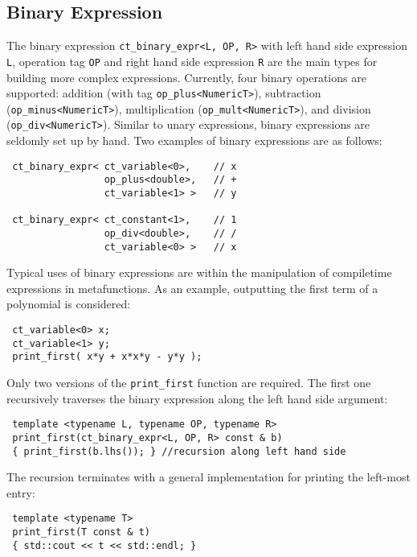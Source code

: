 \subsection{Binary Expression}
The binary expression \lstinline|ct_binary_expr<L, OP, R>| with left hand side expression \lstinline|L|, operation tag \lstinline|OP| and right hand side expression \lstinline|R| are the main types for building more complex expressions.
Currently, four binary operations are supported: addition (with tag \lstinline|op_plus<NumericT>|), subtraction (\lstinline|op_minus<NumericT>|), multiplication (\lstinline|op_mult<NumericT>|), and division (\lstinline|op_div<NumericT>|).
Similar to unary expressions, binary expressions are seldomly set up by hand.
Two examples of binary expressions are as follows:
\begin{lstlisting}
 ct_binary_expr< ct_variable<0>,    // x
                 op_plus<double>,   // +
                 ct_variable<1> >   // y  

 ct_binary_expr< ct_constant<1>,    // 1
                 op_div<double>,    // /
                 ct_variable<0> >   // x
\end{lstlisting}

Typical uses of binary expressions are within the manipulation of compiletime expressions in metafunctions. As an example, outputting the first term of a polynomial is considered:
\begin{lstlisting}
 ct_variable<0> x;
 ct_variable<1> y;
 print_first( x*y + x*x*y - y*y );
\end{lstlisting}
Only two versions of the \lstinline|print_first| function are required.
The first one recursively traverses the binary expression along the left hand side argument:
\begin{lstlisting}
 template <typename L, typename OP, typename R>
 print_first(ct_binary_expr<L, OP, R> const & b)
 { print_first(b.lhs()); } //recursion along left hand side
\end{lstlisting}
The recursion terminates with a general implementation for printing the left-most entry:
\begin{lstlisting}
 template <typename T>
 print_first(T const & t)
 { std::cout << t << std::endl; }
\end{lstlisting}







